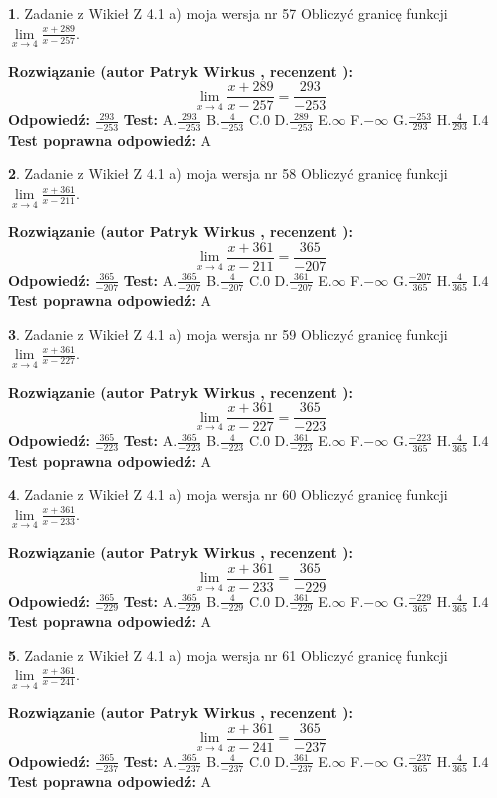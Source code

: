 \documentclass[12pt, a4paper]{article}
\theoremstyle{definition} %
\newtheorem{zad}{}
\newcommand{\zadStart}[1]{\begin{zad}#1\newline}
\newcommand{\zadStop}{\end{zad}}
\newcommand{\rozwStart}[2]{\noindent \textbf{Rozwiązanie (autor #1 , recenzent #2): }\newline}
\newcommand{\rozwStop}{\newline}
\newcommand{\odpStart}{\noindent \textbf{Odpowiedź:}\newline}
\newcommand{\odpStop}{\newline}
\newcommand{\testStart}{\noindent \textbf{Test:}\newline}
\newcommand{\testStop}{\newline}
\newcommand{\kluczStart}{\noindent \textbf{Test poprawna odpowiedź:}\newline}
\newcommand{\kluczStop}{\newline}
\begin{document}
\zadStart{Zadanie z Wikieł Z 4.1 a) moja wersja nr 57}
Obliczyć granicę funkcji $\lim\limits_{x\to4}\frac{x+289}{x-257}$.
\zadStop
\rozwStart{Patryk Wirkus}{}
$$\lim\limits_{x\to4}\frac{x+289}{x-257} = \frac{293}{-253}$$
\rozwStop
\odpStart
$\frac{293}{-253}$
\odpStop
\testStart
A.$\frac{293}{-253}$
B.$\frac{4}{-253}$
C.$0$
D.$\frac{289}{-253}$
E.$\infty$
F.$-\infty$
G.$\frac{-253}{293}$
H.$\frac{4}{293}$
I.$4$
\testStop
\kluczStart
A
\kluczStop



\zadStart{Zadanie z Wikieł Z 4.1 a) moja wersja nr 58}
Obliczyć granicę funkcji $\lim\limits_{x\to4}\frac{x+361}{x-211}$.
\zadStop
\rozwStart{Patryk Wirkus}{}
$$\lim\limits_{x\to4}\frac{x+361}{x-211} = \frac{365}{-207}$$
\rozwStop
\odpStart
$\frac{365}{-207}$
\odpStop
\testStart
A.$\frac{365}{-207}$
B.$\frac{4}{-207}$
C.$0$
D.$\frac{361}{-207}$
E.$\infty$
F.$-\infty$
G.$\frac{-207}{365}$
H.$\frac{4}{365}$
I.$4$
\testStop
\kluczStart
A
\kluczStop



\zadStart{Zadanie z Wikieł Z 4.1 a) moja wersja nr 59}
Obliczyć granicę funkcji $\lim\limits_{x\to4}\frac{x+361}{x-227}$.
\zadStop
\rozwStart{Patryk Wirkus}{}
$$\lim\limits_{x\to4}\frac{x+361}{x-227} = \frac{365}{-223}$$
\rozwStop
\odpStart
$\frac{365}{-223}$
\odpStop
\testStart
A.$\frac{365}{-223}$
B.$\frac{4}{-223}$
C.$0$
D.$\frac{361}{-223}$
E.$\infty$
F.$-\infty$
G.$\frac{-223}{365}$
H.$\frac{4}{365}$
I.$4$
\testStop
\kluczStart
A
\kluczStop



\zadStart{Zadanie z Wikieł Z 4.1 a) moja wersja nr 60}
Obliczyć granicę funkcji $\lim\limits_{x\to4}\frac{x+361}{x-233}$.
\zadStop
\rozwStart{Patryk Wirkus}{}
$$\lim\limits_{x\to4}\frac{x+361}{x-233} = \frac{365}{-229}$$
\rozwStop
\odpStart
$\frac{365}{-229}$
\odpStop
\testStart
A.$\frac{365}{-229}$
B.$\frac{4}{-229}$
C.$0$
D.$\frac{361}{-229}$
E.$\infty$
F.$-\infty$
G.$\frac{-229}{365}$
H.$\frac{4}{365}$
I.$4$
\testStop
\kluczStart
A
\kluczStop



\zadStart{Zadanie z Wikieł Z 4.1 a) moja wersja nr 61}
Obliczyć granicę funkcji $\lim\limits_{x\to4}\frac{x+361}{x-241}$.
\zadStop
\rozwStart{Patryk Wirkus}{}
$$\lim\limits_{x\to4}\frac{x+361}{x-241} = \frac{365}{-237}$$
\rozwStop
\odpStart
$\frac{365}{-237}$
\odpStop
\testStart
A.$\frac{365}{-237}$
B.$\frac{4}{-237}$
C.$0$
D.$\frac{361}{-237}$
E.$\infty$
F.$-\infty$
G.$\frac{-237}{365}$
H.$\frac{4}{365}$
I.$4$
\testStop
\kluczStart
A
\kluczStop
\end{document}
